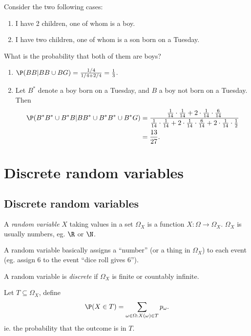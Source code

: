 \documentclass[a4paper]{article}
\begin{document}
\begin{eg}
  Consider the two following cases:
  \begin{enumerate}
    \item I have 2 children, one of whom is a boy.
    \item I have two children, one of whom is a son born on a Tuesday.
  \end{enumerate}
  What is the probability that both of them are boys?

  \begin{enumerate}
    \item $\P(BB|BB\cup BG) = \frac{1/4}{1/4 + 2/4} = \frac{1}{3}$.
    \item Let $B^*$ denote a boy born on a Tuesday, and $B$ a boy not born on a Tuesday. Then 
      \begin{align*}
        \P(B^*B^* \cup B^*B| BB^* \cup B^*B^*\cup B^*G)&=\frac{\frac{1}{14}\cdot \frac{1}{14} + 2\cdot \frac{1}{14}\cdot\frac{6}{14}}{\frac{1}{14}\cdot \frac{1}{14} + 2\cdot \frac{1}{14}\cdot\frac{6}{14} + 2\cdot \frac{1}{14}\cdot \frac{1}{2}}\\
        &= \frac{13}{27}.
      \end{align*}
  \end{enumerate}
\end{eg}

\section{Discrete random variables}
\subsection{Discrete random variables}
\begin{defi}
  A \emph{random variable} $X$ taking values in a set $\Omega_X$ is a function $X: \Omega \to \Omega_X$. $\Omega_X$ is usually numbers, eg. $\R$ or $\N$.

  A random variable basically assigns a ``number'' (or a thing in $\Omega_X$) to each event (eg. assign $6$ to the event ``dice roll gives 6'').
\end{defi}

\begin{defi}
  A random variable is \emph{discrete} if $\Omega_X$ is finite or countably infinite.
\end{defi}

\begin{notation}
  Let $T\subseteq \Omega_X$, define
  \[
    \P(X\in T) = \sum_{\omega \in \Omega: X(\omega)\in T}p_\omega.
  \]
  ie. the probability that the outcome is in $T$.
\end{notation}
\end{document}
